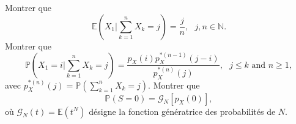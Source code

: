 \documentclass[12pt]{exam}
\begin{document}
\begin{questions}
\begin{parts}
\end{parts}
\question Montrer que 
\begin{equation*}
\mathbb{E}\left(X_1\Big\rvert \sum_{k=1}^{n}X_k=j\right)=\frac{j}{n},\text{ }j,n\in\mathbb{N}.
\end{equation*}
\question Montrer que 
\begin{equation*}
\mathbb{P}\left(X_1=i\Big\rvert \sum_{k=1}^{n}X_k=j\right)=\frac{p_X(i)p_{X}^{\ast(n-1)}(j-i)}{p_{X}^{\ast(n)}(j)},\text{ }j\leq k\text{ and }n\geq1,
\end{equation*}
avec $p_{X}^{\ast(n)}(j)=\mathbb{P}\left(\sum_{k=1}^{n}X_k=j\right)$.
%
\question Montrer que 
\begin{equation*}
\mathbb{P}\left(S=0\right)=\mathcal{G}_N\left[p_X(0)\right],
\end{equation*}
où $\mathcal{G}_N(t)=\mathbb{E}\left(t^{N}\right)$ désigne la fonction génératrice des probabilités de $N$.

\end{questions}
\end{document}
